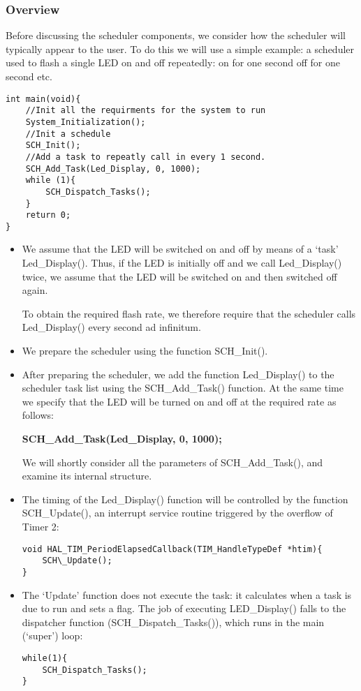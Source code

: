 \subsubsection{Overview}
Before discussing the scheduler components, we consider how the scheduler will
typically appear to the user. To do this we will use a simple example: a scheduler used
to flash a single LED on and off repeatedly: on for one second off for one second etc.
\begin{lstlisting}[basicstyle=\small, caption=Example of how to use a scheduler]
int main(void){
    //Init all the requirments for the system to run
	System_Initialization();
	//Init a schedule
	SCH_Init();
	//Add a task to repeatly call in every 1 second.
	SCH_Add_Task(Led_Display, 0, 1000);
	while (1){
		SCH_Dispatch_Tasks();
	}
	return 0;
}
\end{lstlisting}
\begin{itemize}
    \item We assume that the LED will be switched on and off by means of a ‘task’
Led\_Display(). Thus, if the LED is initially off and we call
Led\_Display() twice, we assume that the LED will be switched on and
then switched off again. 

To obtain the required flash rate, we therefore require that the scheduler calls
Led\_Display() every second ad infinitum.

    \item We prepare the scheduler using the function SCH\_Init().
    \item After preparing the scheduler, we add the function Led\_Display() to the
scheduler task list using the SCH\_Add\_Task() function. At the same time we specify that the LED will be turned on and off at the required rate as follows:

\textbf{SCH\_Add\_Task(Led\_Display, 0, 1000);}

We will shortly consider all the parameters of SCH\_Add\_Task(), and examine its
internal structure.

\item The timing of the Led\_Display() function will be controlled by the function
SCH\_Update(), an interrupt service routine triggered by the overflow of Timer 2:
\begin{lstlisting}[basicstyle=\small, caption=Example of how to call SCH\_Update function]
void HAL_TIM_PeriodElapsedCallback(TIM_HandleTypeDef *htim){
	SCH\_Update();
}
\end{lstlisting}

\item The ‘Update’ function does not execute the task: it calculates when a task is due to run and sets a flag. The job of executing LED\_Display() falls to the dispatcher
function (SCH\_Dispatch\_Tasks()), which runs in the main (‘super’) loop:
\begin{lstlisting}
while(1){
    SCH_Dispatch_Tasks();
}
\end{lstlisting}

\end{itemize}

